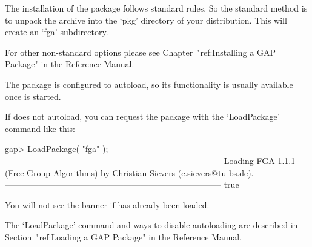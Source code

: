 

\null

The installation of the {\FGA} package follows standard {\GAP} rules.
So the standard method is to unpack the archive into the `pkg'
directory  of your {\GAP} distribution.  This will create an `fga'
subdirectory. 

For other non-standard options please see Chapter~"ref:Installing a
GAP Package" in the {\GAP} Reference Manual.


\null

The {\FGA} package is configured to autoload, so its functionality is
usually available once {\GAP} is started.

If {\GAP} does not autoload, you can request the package with the
`LoadPackage' command like this:

\testexamplefalse
\beginexample
gap> LoadPackage( "fga" );
-----------------------------------------------------------------------------
Loading  FGA 1.1.1 (Free Group Algorithms)
by Christian Sievers (c.sievers@tu-bs.de).
-----------------------------------------------------------------------------
true
\endexample

You will not see the banner if {\FGA} has already been loaded.

The `LoadPackage' command and ways to disable autoloading are
described in Section~"ref:Loading a GAP Package" in the {\GAP}
Reference Manual.

